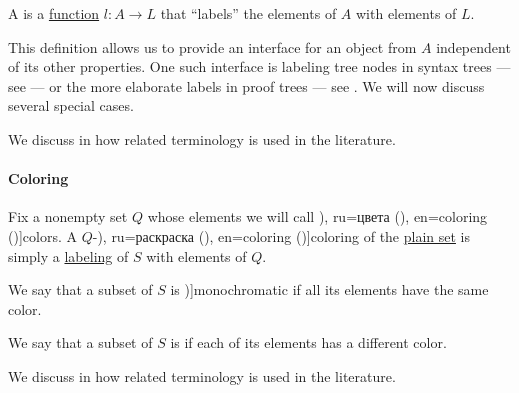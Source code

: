 \begin{definition}\label{def:labeled_set}\mimprovised
  A  is a \hyperref[def:function]{function} \( l: A \to L \) that \enquote{labels} the elements of \( A \) with elements of \( L \).
\end{definition}
\begin{comments}
  \item This definition allows us to provide an interface for an object from \( A \) independent of its other properties. One such interface is labeling tree nodes in syntax trees --- see  --- or the more elaborate labels in proof trees --- see . We will now discuss several special cases.

  \item We discuss in  how related terminology is used in the literature.
\end{comments}

\paragraph{Coloring}

\begin{definition}\label{def:set_coloring}\mimprovised
  Fix a nonempty set \( Q \) whose elements we will call \term[bg=цветове (\cite[141]{Мирчев2001}), ru=цвета (\cite[\S 10.7.1]{Новиков2013}), en=coloring (\cite[111]{Diestel2005})]{colors}. A \( Q \)-\term[bg=оцветяване (\cite[141]{Мирчев2001}), ru=раскраска (\cite[\S 10.7.1]{Новиков2013}), en=coloring (\cite[111]{Diestel2005})]{coloring} of the \hyperref[def:set]{plain set} is simply a \hyperref[def:labeled_set]{labeling} of \( S \) with elements of \( Q \).

  \begin{thmenum}
     We say that a subset of \( S \) is \term[ru=одноцветный (класс) (\cite[\S 10.7.1]{Новиков2013})]{monochromatic} if all its elements have the same color.

     We say that a subset of \( S \) is  if each of its elements has a different color.
  \end{thmenum}
\end{definition}
\begin{comments}
  \item We discuss in  how related terminology is used in the literature.
\end{comments}

